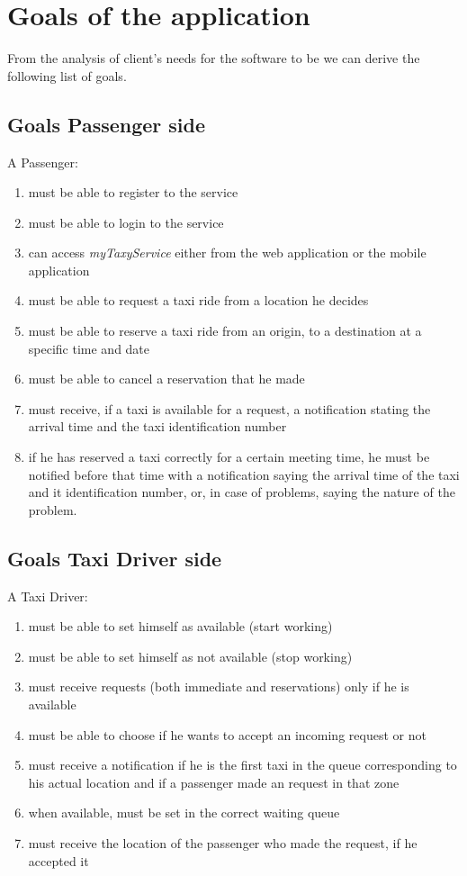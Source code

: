 \section{Goals of the application}
From the analysis of client's needs for the software to be we can derive the following list of goals.
\subsection{Goals Passenger side}
A Passenger:
\begin{enumerate}[label=G.P.{\arabic*})]
\item must be able to register to the service
\item must be able to login to the service
\item can access \textit{myTaxyService} either from the web application or the mobile application
\item must be able to request a taxi ride from a location he decides
\item must be able to reserve a taxi ride from an origin, to a destination at a specific time and date
\item must be able to cancel a reservation that he made
\item must receive, if a taxi is available for a request, a notification stating the arrival time and the taxi identification number
\item if he has reserved a taxi correctly for a certain meeting time, he must be notified before that time with a notification saying the arrival time of the taxi and it identification number, or, in case of problems, saying the nature of the problem.
\end{enumerate}
\subsection{Goals Taxi Driver side}
A Taxi Driver:
\begin{enumerate}[label=G.T.{\arabic*})]
\item must be able to set himself as available (start working) 
\item must be able to set himself as not available (stop working)
\item must receive requests (both immediate and reservations) only if he is available 
\item must be able to choose if he wants to accept an incoming request or not
\item must receive a notification if he is the first taxi in the queue corresponding to his actual location and if a passenger made an request in that zone
\item when available, must be set in the correct waiting queue
\item must receive the location of the passenger who made the request, if he accepted it
\end{enumerate}

